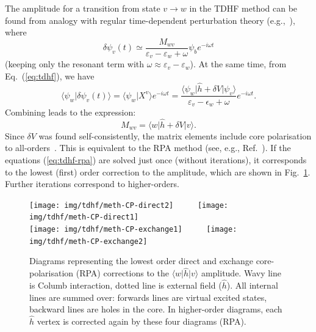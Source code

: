 \documentclass[10pt,twocolumn,a4paper]{article}%
\newcommand{\bra}[1]{\ensuremath{\langle #1|}}	%
\newcommand{\ket}[1]{\ensuremath{|#1\rangle}}	%
\newcommand{\braket}[1]{\ensuremath{\langle #1\rangle}}	%
\newcommand{\be}{\begin{equation}}
\newcommand{\ee}{\end{equation}}
\def\e{\ensuremath{\epsilon}}
\def\en{\ensuremath{\varepsilon}}
\newcommand{\w}{\ensuremath{\omega}}
\begin{document}
The amplitude for a transition from state $v\to w$ in the TDHF method can be found from analogy with regular time-dependent perturbation theory (e.g.,~\cite{Sakurai2011}), where
\[
\delta\psi_v(t) \simeq \frac{M_{wv}}{\en_v-\en_w+\w}\psi_be^{-i\w t}
\]
(keeping only the resonant term with $\w\approx\en_v-\en_w$).
At the same time, from Eq.~(\ref{eq:tdhf}), we have
\be
\braket{\psi_w | \delta\psi_v(t)} = \braket{\psi_w | X^v}e^{-i\w t}
= \frac{\bra{\psi_w} \hat h + \delta V \ket{\psi_v}}{\en_v - \e_w + \w}e^{-i\w t}.
\ee
Combining leads to the expression: %
\be
M_{wv} = \bra{w}\hat h + \delta V\ket{v}.
\ee
Since $\delta V$ was found self-consistently, the matrix elements include core polarisation  to all-orders~\cite{DzubaHFS1984,Dzuba1987jpbRPA}.
This is equivalent to the RPA method (see, e.g., Ref.~\cite{JohnsonBook2007}).
If the equations (\ref{eq:tdhf-rpa}) are solved just once (without iterations), it corresponds to the lowest (first) order correction to the amplitude, which are shown in Fig.~\ref{fig:corePol}.
Further iterations correspond to higher-orders.


\begin{figure}%
\centering
\texttt{[image: img/tdhf/meth-CP-direct2]}~~~~~
\texttt{[image: img/tdhf/meth-CP-direct1]}\\
\texttt{[image: img/tdhf/meth-CP-exchange1]}~~~~~
\texttt{[image: img/tdhf/meth-CP-exchange2]}
\caption{\small Diagrams representing the lowest order direct and exchange core-polarisation (RPA) corrections to the $\bra{w}\hat h\ket{v}$ amplitude.
Wavy line is Columb interaction, dotted line is external field ($\hat h$). All internal lines are summed over: forwards lines are virtual excited states, backward lines are holes in the core.
In higher-order diagrams, each $\hat h$ vertex is corrected again by these four diagrams (RPA).\label{fig:corePol}}
\end{figure}
\end{document}
